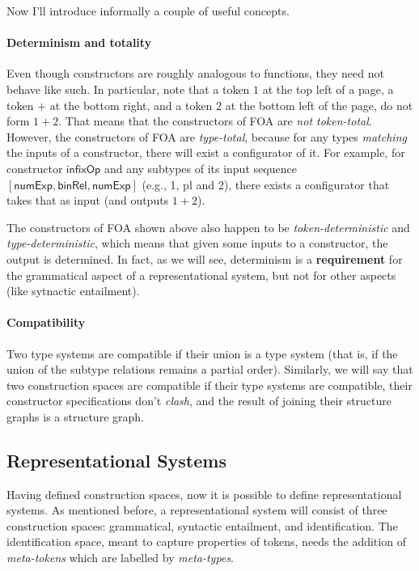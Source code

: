 \documentclass[a4paper]{article}
\theoremstyle{definition}
\begin{document}
	Now I'll introduce informally a couple of useful concepts.
		\paragraph{Determinism and totality}
		Even though constructors are roughly analogous to functions, they need not behave like such. In particular, note that a token $1$ at the top left of a page, a token $+$ at the bottom right, and a token $2$ at the bottom left of the page, do not form $1+2$. That means that the constructors of FOA are \textit{not token-total}. However, the constructors of FOA are \textit{type-total}, because for any types \textit{matching} the inputs of a constructor, there will exist a configurator of it. For example, for constructor $\textsf{infixOp}$ and any subtypes of its input sequence $[\textsf{numExp},\textsf{binRel},\textsf{numExp}]$ (e.g., \textsf{1}, \textsf{pl} and \textsf{2}), there exists a configurator that takes that as input (and outputs $1+2$).

		The constructors of FOA shown above also happen to be \textit{token-deterministic} and \textit{type-deterministic}, which means that given some inputs to a constructor, the output is determined. In fact, as we will see, determinism is a \textbf{requirement} for the {grammatical} aspect of a representational system, but not for other aspects (like {sytnactic entailment}).

		\paragraph{Compatibility}
		Two type systems are compatible if their union is a type system (that is, if the union of the subtype relations remains a partial order). Similarly, we will say that two construction spaces are compatible if their type systems are compatible, their constructor specifications don't \textit{clash}, and the result of joining their structure graphs is a structure graph.

	\subsection{Representational Systems}
	Having defined construction spaces, now it is possible to define representational systems. As mentioned before, a representational system will consist of three construction spaces: grammatical, syntactic entailment, and identification. The identification space, meant to capture properties of tokens, needs the addition of \textit{meta-tokens} which are labelled by \textit{meta-types}.
\end{document}
